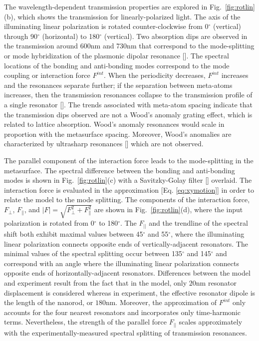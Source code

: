 The wavelength-dependent transmission properties are explored in Fig.~\ref{fig:rotlin}(b), which shows the transmission for linearly-polarized light. The axis of the illuminating linear polarization is rotated counter-clockwise from 0$^\circ$ (vertical) through 90$^\circ$ (horizontal) to 180$^\circ$ (vertical). Two absorption dips are observed in the transmission around 600nm and 730nm that correspond to the mode-splitting or mode hybridization of the plasmonic dipolar resonance [\cite{Prodan}]. 
The spectral locations of the bonding and anti-bonding modes correspond to the mode coupling or interaction force $F^{int}$. When the periodicity decreases, $F^{int}$ increases and the resonances separate further; if the separation between meta-atoms increases, then the transmission resonances collapse to the transmission profile of a single resonator [\cite{Prodan}]. The trends associated with meta-atom spacing indicate that the transmission dips observed are not a Wood's anomaly grating effect, which is related to lattice absorption. Wood's anomaly resonances would scale in proportion with the metasurface spacing. Moreover, Wood's anomalies are characterized by ultrasharp resonances [\cite{Yang16}] which are not observed. 

The parallel component of the interaction force leads to the mode-splitting in the metasurface. The spectral difference between the bonding and anti-bonding modes is shown in Fig.~\ref{fig:rotlin}(c) with a Savitzky-Golay filter [\cite{Savgol}] overlaid. The interaction force is evaluated in the approximation [Eq. \ref{eq:xymotion}] in order to relate the model to the mode splitting. The components of the interaction force, $F_{\perp}$, $F_{\parallel}$, and $|F| = \sqrt{F_{\perp}^2+F_{\parallel}^2}$ are shown in Fig.~\ref{fig:rotlin}(d), where the input polarization is rotated from 0$^\circ$ to 180$^\circ$. The $F_{||}$ and the trendline of the spectral shift both exhibit maximal values between 45$^\circ$ and 55$^\circ$, where the illuminating linear polarization connects opposite ends of vertically-adjacent resonators.  The minimal values of the spectral splitting occur between 135$^\circ$ and 145$^\circ$ and correspond with an angle where the illuminating linear polarization connects opposite ends of horizontally-adjacent resonators.  Differences between the model and experiment result from the fact that in the model, only $20$nm resonator displacement is considered whereas in experiment, the effective resonator dipole is the length of the nanorod, or $180$nm. Moreover, the approximation of $F^{int}$ only accounts for the four nearest resonators and incorporates only time-harmonic terms.  Nevertheless, the strength of the parallel force $F_{||}$ scales approximately with the experimentally-measured spectral splitting of transmission resonances. 
 
